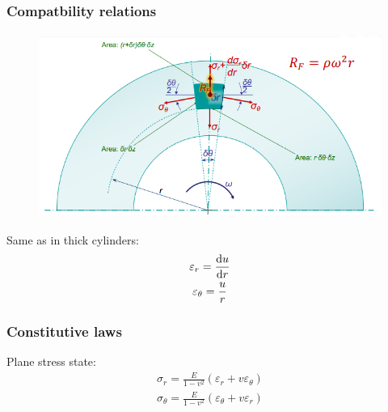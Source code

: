 \documentclass[class=report, crop=false, 12pt,a4paper]{standalone}
\begin{document}
\subsubsection{Compatbility relations}
\begin{figure}[H]
    \centering
    \includegraphics[height = 6cm]{../img/diagram129.png}
    \caption{}
\end{figure}
Same as in thick cylinders:
\begin{gather}
    \varepsilon_r = \frac{\dif u}{\dif r}\\
    \varepsilon_{\theta} = \frac{u}{r}
\end{gather}
\subsubsection{Constitutive laws}
Plane stress state:
\begin{gather}
    \sigma_r = \frac{E}{1-v^2} \left(\varepsilon_r + v \varepsilon_{\theta}\right)\\
    \sigma_{\theta} = \frac{E}{1-v^2} \left(\varepsilon_{\theta} + v \varepsilon_{r}\right)
\end{gather}
\end{document}
